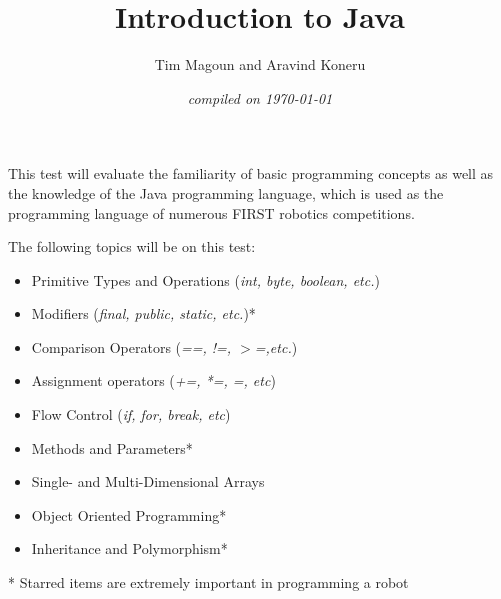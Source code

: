 \documentclass[11pt,fleqn]{article}
\begin{document}
\title{Introduction to \bf{Java}}
\author{Tim Magoun and Aravind Koneru}
\date{\it{compiled on} \today}
\maketitle


This test will evaluate the familiarity of basic programming concepts as well as the knowledge of the
Java programming language, which is used as the programming language of numerous FIRST\textsuperscript\textregistered
robotics competitions.


\vspace{5mm}
The following topics will be on this test:
\begin{itemize}
\item Primitive Types and Operations (\textit{int, byte, boolean, etc.})
\item Modifiers (\textit{final, public, static, etc.})*
\item Comparison Operators (\textit{==, !=, $\mathit{>}$=,etc.})
\item Assignment operators (\textit{+=, *=, =, etc})
\item Flow Control (\textit{if, for, break, etc})
\item Methods and Parameters*
\item Single- and Multi-Dimensional Arrays
\item Object Oriented Programming*
\item Inheritance and Polymorphism*
\end{itemize}

* Starred items are extremely important in programming a robot
\end{document}
